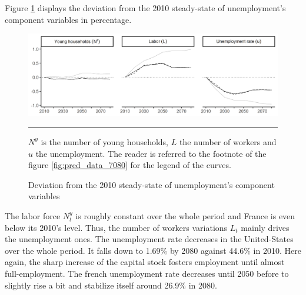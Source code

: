 Figure \ref{fig:dev_unemp_1080} displays the deviation from the 2010 steady-state of unemployment's component variables in percentage.
\begin{figure}[tb]
	\centering
	\includegraphics[width=1\linewidth]{../result/deviation/dev_unemp1080.png}
	\caption{Deviation from the 2010 steady-state of unemployment's component variables}
	\label{fig:dev_unemp_1080}
	\vspace{.5ex}
	\hrule
	\vspace{-4ex}
	\justify\singlespacing\footnotesize $N^y$ is the number of young households, $L$ the number of workers and $u$ the unemployment. The reader is referred to the footnote of the figure \ref{fig:pred_data_7080} for the legend of the curves.
\end{figure}
The labor force $N^y_t$ is roughly constant over the whole period and France is even below its 2010's level. Thus, the number of workers variations $L_t$ mainly drives the unemployment ones. The unemployment rate decreases in the United-States over the whole period. It falls down to 1.69\% by 2080 against 44.6\% in 2010. Here again, the sharp increase of the capital stock fosters employment until almost full-employment. The french unemployment rate decreases until 2050 before to slightly rise a bit and stabilize itself around 26.9\% in 2080.

